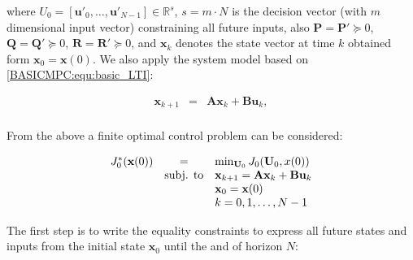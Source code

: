    where $U_0=[\textbf{u}'_0,\dots,\textbf{u}'_{N-1}]\in\mathbb{R}^s$, $s=m\cdot N$ is the decision vector (with $m$ dimensional input vector) constraining all future inputs, also $\textbf{P}=\textbf{P}'\succeq 0$, $\textbf{Q}=\textbf{Q}'\succeq 0$, $\textbf{R}=\textbf{R}'\succeq 0$, and $\textbf{x}_k$ denotes the state vector at time $k$ obtained form $\textbf{x}_0=\textbf{x}(0)$. We also apply the system model based on \ref{BASICMPC:equ:basic_LTI}:

    \begin{equation}
        \begin{array}{rcl}
            \textbf{x}_{k+1}&=&\textbf{Ax}_k+\textbf{Bu}_k,\\
        \end{array}
        \label{BASICMPC:equ:basic_horizon model}
    \end{equation}

   From the above a finite optimal control problem can be considered:

   \begin{equation}
        \begin{array}{rcl}
         J^*_0(\textbf{x}(0))&=&\min_{\textbf{U}_0}J_0(\textbf{U}_0,x(0))\\
         &\textnormal{subj. to}&\textbf{x}_{k+1}=\textbf{Ax}_k+\textbf{Bu}_k\\
         &&\textbf{x}_0=\textbf{x}(0)\\
         &&k=0,1,\dots,N-1
        \end{array}
        \label{BASICMPC:equ:optimal_control_problem_Euclidian}
    \end{equation}


    The first step is to write the equality constraints to express all future states and inputs from the initial state $\textbf{x}_0$ until the and of horizon $N$:

